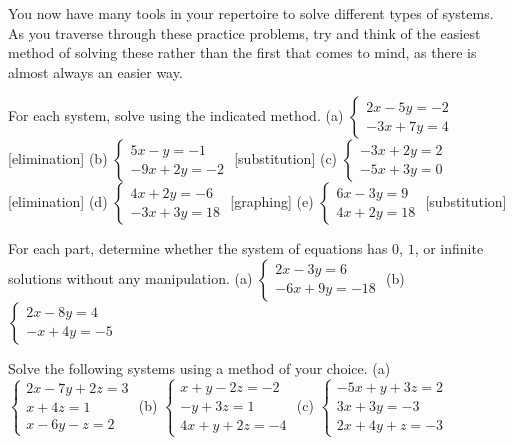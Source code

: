 \documentclass[lang=en,11pt]{elegantbook}
\begin{document}
You now have many tools in your repertoire to solve different types of systems.  As you traverse through these practice problems, try and think of the easiest method of solving these rather than the first that comes to mind, as there is almost always an easier way.
\begin{reviewset}
\item For each system, solve using the indicated method.  \newline 
(a) $\begin{cases} 2x-5y=-2 \\ -3x+7y=4\end{cases}$ [elimination] 
(b) $\begin{cases} 5x-y=-1 \\ -9x+2y=-2\end{cases}$ [substitution] \newline 
(c) $\begin{cases} -3x+2y=2 \\ -5x+3y=0\end{cases}$ [elimination]\hspace{19mm}
(d) $\begin{cases} 4x+2y=-6 \\ -3x+3y=18\end{cases}$ [graphing]\newline 
(e) $\begin{cases} 6x-3y=9 \\ 4x+2y=18\end{cases}$ [substitution]
\item For each part, determine whether the system of equations has $0$, $1$, or infinite solutions without any manipulation.  \newline 
(a) $\begin{cases} 2x-3y=6 \\ -6x+9y=-18 \end{cases}$ \hspace{50mm} (b) $\begin{cases} 2x-8y=4 \\ -x+4y=-5 \end{cases}$ \newline
\item Solve the following systems using a method of your choice.  \newline 
(a) $\begin{cases} 2x-7y+2z=3 \\ x+4z=1 \\ x-6y-z=2\end{cases}$ \hspace{5mm} (b) $\begin{cases} x+y-2z=-2 \\ -y+3z=1 \\ 4x+y+2z=-4\end{cases}$ \hspace{5mm} (c) $\begin{cases} -5x+y+3z=2 \\ 3x+3y=-3 \\ 2x+4y+z=-3\end{cases}$ \newline

\end{reviewset}
\end{document}
